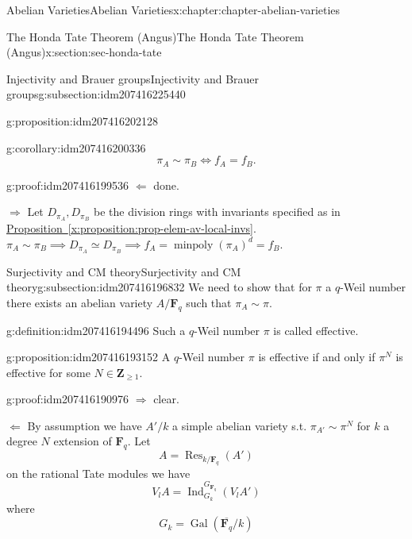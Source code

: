 \documentclass[oneside,10pt,]{book}
\numberwithin{equation}{section}
\newcommand{\ZZ}{\mathbf{Z}}
\newcommand{\FF}{\mathbf{F}}
\newcommand{\Gal}[2]{\operatorname{Gal}(#1/#2)}
\DeclareMathOperator{\Ind}{Ind}
\DeclareMathOperator{\Res}{Res}
\begin{document}
\begin{chapterptx}{Abelian Varieties}{}{Abelian Varieties}{}{}{x:chapter:chapter-abelian-varieties}
\begin{sectionptx}{The Honda Tate Theorem (Angus)}{}{The Honda Tate Theorem (Angus)}{}{}{x:section:sec-honda-tate}
\begin{subsectionptx}{Injectivity and Brauer groups}{}{Injectivity and Brauer groups}{}{}{g:subsection:idm207416225440}
\begin{proposition}{}{}{g:proposition:idm207416202128}
\end{proposition}
\begin{corollary}{}{}{g:corollary:idm207416200336}%
%
\begin{equation*}
\pi_A\sim \pi_B \iff f_A = f_B\text{.}
\end{equation*}
%
\end{corollary}
\begin{proofptx}{}{g:proof:idm207416199536}
\(\Leftarrow\) done.%
\par
\(\Rightarrow\) Let \(D_{\pi_A} , D_{\pi_B}\) be the division rings with invariants specified as in \hyperref[x:proposition:prop-elem-av-local-invs]{Proposition~\ref{x:proposition:prop-elem-av-local-invs}}. \(\pi_A\sim \pi_B \implies D_{\pi_A} \simeq D_{\pi_B} \implies f_A = \operatorname{minpoly}(\pi_A) ^d = f_B\).%
\end{proofptx}
\end{subsectionptx}
%
%
\typeout{************************************************}
\typeout{************************************************}
%
\begin{subsectionptx}{Surjectivity and CM theory}{}{Surjectivity and CM theory}{}{}{g:subsection:idm207416196832}
We need to show that for \(\pi\) a \(q\)-Weil number there exists an abelian variety \(A/\FF_q\) such that \(\pi_A \sim \pi\).%
\begin{definition}{}{g:definition:idm207416194496}%
Such a \(q\)-Weil number \(\pi\) is called effective.%
\end{definition}
\begin{proposition}{}{}{g:proposition:idm207416193152}%
A \(q\)-Weil number \(\pi\) is effective if and only if \(\pi^N\) is effective for some \(N\in \ZZ_{\ge 1}\).%
\end{proposition}
\begin{proofptx}{}{g:proof:idm207416190976}
\(\Rightarrow\) clear.%
\par
\(\Leftarrow\) By assumption we have \(A'/k\) a simple abelian variety s.t. \(\pi_{A'} \sim  \pi^N\) for \(k\) a degree \(N\) extension of \(\FF_q\). Let%
\begin{equation*}
A = \Res_{k/\FF_q}(A')
\end{equation*}
on the rational Tate modules we have%
\begin{equation*}
V_l A = \Ind_{G_k}^{G_{\FF_q}} (V_lA')
\end{equation*}
where%
\begin{equation*}
G_k = \Gal{\overline{\FF_q}}{k}

\end{equation*}
\end{proofptx}
\end{subsectionptx}
\end{sectionptx}
\end{chapterptx}
\end{document}
